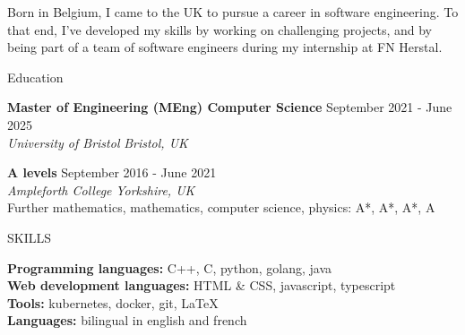 \documentclass{resume} %
\begin{document}


{Born in Belgium, I came to the UK to pursue a career in software engineering. To that end, I've developed my skills by working on challenging projects, and by being part of a team of software engineers during my internship at FN Herstal.}



\begin{rSection}{Education}

{\bf Master of Engineering (MEng) Computer Science} \hfill {September 2021 - June 2025} \\
\textit{University of Bristol} \hfill \textit{Bristol, UK}

{\bf A levels} \hfill {September 2016 - June 2021} \\
\textit{Ampleforth College} \hfill \textit{Yorkshire, UK} \\
Further mathematics, mathematics, computer science, physics: A*, A*, A*, A

\end{rSection}

\begin{rSection}{SKILLS}

{\bf Programming languages:} C++, C, python, golang, java \\
{\bf Web development languages:} HTML \& CSS, javascript, typescript \\
{\bf Tools:} kubernetes, docker, git, LaTeX \\
{\bf Languages:} bilingual in english and french

\end{rSection}
\end{document}
